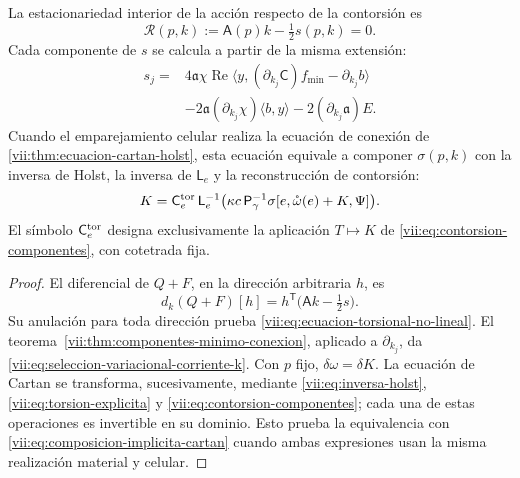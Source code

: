 \begin{proposition}
\label{vii:prop:ecuacion-torsional-no-lineal}
La estacionariedad interior de la acción respecto de la contorsión es
\begin{equation}
 \mathcal R(p,k):=\mathsf A(p)k-\tfrac12s(p,k)=0.
 \label{vii:eq:ecuacion-torsional-no-lineal}
\end{equation}
Cada componente de \(s\) se calcula a partir de la misma extensión:
\begin{equation}
 \begin{split}
 s_j={}&4\mathfrak a\chi\operatorname{Re}
       \langle y,(\partial_{k_j}\mathsf C)f_{\min}
                         -\partial_{k_j}b\rangle\\
 &-2\mathfrak a(\partial_{k_j}\chi)\langle b,y\rangle
       -2(\partial_{k_j}\mathfrak a)E.
 \end{split}
 \label{vii:eq:seleccion-variacional-corriente-k}
\end{equation}
Cuando el emparejamiento celular realiza la ecuación de conexión de
\ref{vii:thm:ecuacion-cartan-holst}, esta ecuación equivale a componer
\(\sigma(p,k)\) con la inversa de Holst, la inversa de
\(\mathsf L_e\) y la reconstrucción de contorsión:
\begin{equation}
 K=\mathsf C_e^{\rm tor}\,\mathsf L_e^{-1}
           \bigl(\kappa c\,\mathsf P_\gamma^{-1}
             \sigma[e,\mathring\omega(e)+K,\Psi]\bigr).
 \label{vii:eq:composicion-implicita-cartan}
\end{equation}
El símbolo \(\mathsf C_e^{\rm tor}\) designa exclusivamente la
aplicación \(T\mapsto K\) de
\eqref{vii:eq:contorsion-componentes}, con cotetrada fija.
\end{proposition}

\begin{proof}
El diferencial de \(Q+F\), en la dirección arbitraria \(h\), es
\[
 d_k(Q+F)[h]
   =h^{\mathsf T}\bigl(\mathsf A k-\tfrac12s\bigr).
\]
Su anulación para toda dirección prueba
\eqref{vii:eq:ecuacion-torsional-no-lineal}.
El teorema~\ref{vii:thm:componentes-minimo-conexion}, aplicado a
\(\partial_{k_j}\), da
\eqref{vii:eq:seleccion-variacional-corriente-k}. Con \(p\) fijo,
\(\delta\omega=\delta K\). La ecuación de Cartan se transforma,
sucesivamente, mediante \eqref{vii:eq:inversa-holst},
\eqref{vii:eq:torsion-explicita} y
\eqref{vii:eq:contorsion-componentes}; cada una de estas operaciones
es invertible en su dominio. Esto prueba la equivalencia con
\eqref{vii:eq:composicion-implicita-cartan} cuando ambas expresiones
usan la misma realización material y celular.
\end{proof}

